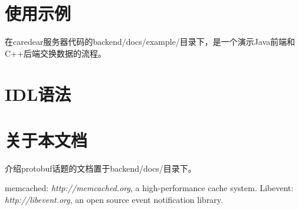 \documentclass[a4paper]{article}
\begin{document}
\section{使用示例}
在caredear服务器代码的backend/docs/example/目录下，是一个演示Java前端和C++后端交换数据的流程。



\section{IDL语法}

\section{关于本文档}
介绍protobuf话题的文档置于backend/docs/目录下。





\begin{thebibliography}{99}
memcached: {\em http://memcached.org}, a high-performance cache system.
 Libevent: {\em http://libevent.org}, an open source event notification library.
\end{thebibliography}
\end{document}
